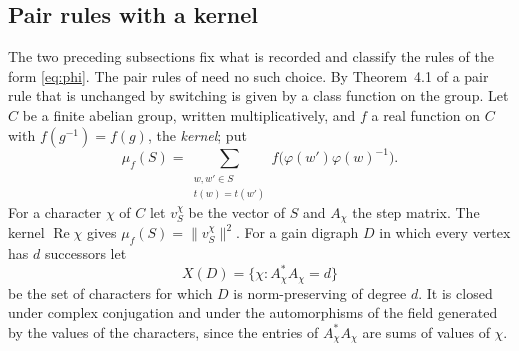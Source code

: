 \subsection{Pair rules with a kernel}
The two preceding subsections fix what is recorded and classify the rules of the form \eqref{eq:phi}. The pair rules of \cite{g8} need no such choice. By Theorem~4.1 of \cite{g8} a pair rule that is unchanged by switching is given by a class function on the group. Let $C$ be a finite abelian group, written multiplicatively, and $f$ a real function on $C$ with $f(g^{-1})=f(g)$, the \emph{kernel}; put
\begin{equation}\label{eq:kernel}
\mu_f(S)=\sum_{\substack{w,w'\in S\\ t(w)=t(w')}}f\bigl(\varphi(w')\varphi(w)^{-1}\bigr).
\end{equation}
For a character $\chi$ of $C$ let $v^{\chi}_S$ be the vector of $S$ and $A_\chi$ the step matrix. The kernel $\operatorname{Re}\chi$ gives $\mu_f(S)=\lVert v^{\chi}_S\rVert^2$. For a gain digraph $D$ in which every vertex has $d$ successors let
\[
X(D)=\{\chi : A_\chi^*A_\chi=d\}
\]
be the set of characters for which $D$ is norm-preserving of degree $d$. It is closed under complex conjugation and under the automorphisms of the field generated by the values of the characters, since the entries of $A_\chi^*A_\chi$ are sums of values of $\chi$.

